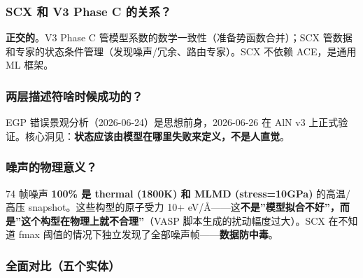 \documentclass[
  12pt,
]{ctexart}
\begin{document}
\subsubsection{SCX 和 V3 Phase C
的关系？}\label{scx-ux548c-v3-phase-c-ux7684ux5173ux7cfb}

\textbf{正交的}。V3 Phase C
管模型系数的数学一致性（准备势函数合并）；SCX
管数据和专家的状态条件管理（发现噪声/冗余、路由专家）。SCX 不依赖
ACE，是通用 ML 框架。

\subsubsection{两层描述符啥时候成功的？}\label{ux4e24ux5c42ux63cfux8ff0ux7b26ux5565ux65f6ux5019ux6210ux529fux7684}

EGP 错误景观分析（2026-06-24）是思想前身，2026-06-26 在 AlN v3
上正式验证。核心洞见：\textbf{状态应该由模型在哪里失败来定义，不是人直觉}。

\subsubsection{噪声的物理意义？}\label{ux566aux58f0ux7684ux7269ux7406ux610fux4e49-1}

74 帧噪声 \textbf{100\% 是 thermal (1800K) 和 MLMD (stress=10GPa)}
的高温/高压 snapshot。这些构型的原子受力 10+
eV/Å------这\textbf{不是''模型拟合不好''，而是''这个构型在物理上就不合理''}（VASP
脚本生成的扰动幅度过大）。SCX 在不知道 fmax
阈值的情况下独立发现了全部噪声帧------\textbf{数据防中毒}。

\subsubsection{全面对比（五个实体）}\label{ux5168ux9762ux5bf9ux6bd4ux4e94ux4e2aux5b9eux4f53}
\end{document}
